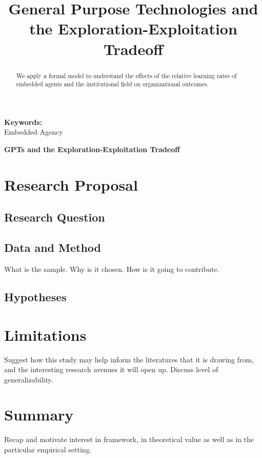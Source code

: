 \documentclass[12pt,letterpaper]{article}
\begin{document}
\title{General Purpose Technologies and the Exploration-Exploitation Tradeoff}
\date{}
\maketitle

\begin{abstract} 
\normalsize 
We apply a formal model to understand the effects of the relative learning rates of embedded agents and the institutional field on organizational outcomes. 
\end{abstract}


{\textbf{Keywords:} \\\indent Embedded Agency}

\newpage
\pagestyle{fancy}
\fancyhf{}
\rhead{\thepage}

\begin{center}
\textbf{GPTs and the Exploration-Exploitation Tradeoff}
\end{center}


\section{Research Proposal}
\subsection{Research Question}

\subsection{Data and Method}
What is the sample. Why is it chosen. How is it going to contribute.

\subsection{Hypotheses}

\section{Limitations}
Suggest how this study may help inform the literatures that it is drawing from, and the interesting research avenues it will open up. Discuss level of generalizability.

\section{Summary}
Recap and motivate interest in framework, in theoretical value as well as in the particular empirical setting.
\end{document}
